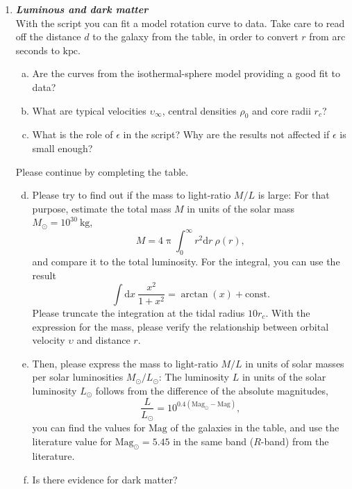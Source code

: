 \documentclass[a4paper,12pt]{article}
\newcommand{\question}[1]{\textbf{\textit{#1}}}
\newcommand{\dd}{\mathrm{d}}
\renewcommand{\pi}{\uppi}
\begin{document}
\begin{enumerate}
\item \question{Luminous and dark matter}\\
With the script  you can fit a model rotation curve to data. Take care to read off the distance $d$ to the galaxy from the table, in order to convert $r$ from arc seconds to $\mathrm{kpc}$.
\begin{enumerate}[(a)]
\item{Are the curves from the isothermal-sphere model providing a good fit to data?}
\item{What are typical velocities $\upsilon_\infty$, central densities $\rho_0$ and core radii $r_c$?}
\item{What is the role of $\epsilon$ in the script? Why are the results not affected if $\epsilon$ is small enough?}
\end{enumerate}
Please continue by completing the table.
\begin{enumerate}[(a)]
\setcounter{enumii}{3}
\item{Please try to find out if the mass to light-ratio $M/L$ is large: For that purpose, estimate the total mass $M$ in units of the solar mass $M_\odot = 10^{30}~\mathrm{kg}$,
\begin{equation}
M = 4\pi\int_0^\infty r^2\mathrm{d}r\: \rho(r),
\end{equation}
and compare it to the total luminosity. For the integral, you can use the result
\begin{equation}
\int\dd x\:\frac{x^2}{1+x^2} = \arctan(x) + \mathrm{const}.
\end{equation}
Please truncate the integration at the tidal radius $10r_c$. With the expression for the mass, please verify the relationship between orbital velocity $\upsilon$ and distance $r$.
}
\item{Then, please express the mass to light-ratio $M/L$ in units of solar masses per solar luminosities $M_\odot/L_\odot$: The luminosity $L$ in units of the solar luminosity $L_\odot$ follows from the difference of the absolute magnitudes,
\begin{equation}
\frac{L}{L_\odot} = 10^{0.4(\mathrm{Mag}_\odot - \mathrm{Mag})},
\end{equation}
you can find the values for $\mathrm{Mag}$ of the galaxies in the table, and use the literature value for $\mathrm{Mag}_\odot=5.45$ in the same band ($R$-band) from the literature.
}
\item{Is there evidence for dark matter?}
\end{enumerate}


\end{enumerate}
\end{document}
